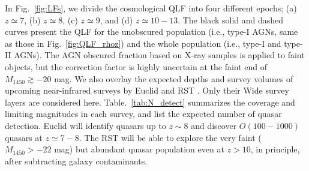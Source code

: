 \documentclass[twocolumn, twocolappendix]{aastex63}
\newcommand{\Muv}{M_{1450}}
\begin{document}
\begin{CJK*}{UTF8}{gbsn}
In Fig.~\ref{fig:LFs}, we divide the cosmological QLF into four different epochs; (a) $z\simeq 7$, (b) $z\simeq 8$, (c) $z\simeq 9$, and (d) $z\simeq 10-13$.
The black solid and dashed curves present the QLF for the unobscured population (i.e., type-I AGNs, same as those in Fig.~\ref{fig:QLF_rhoz})
and the whole population (i.e., type-I and type-II AGNs).
The AGN obscured fraction based on X-ray samples \citep{2014ApJ...786..104U} is applied to faint objects, 
but the correction factor is highly uncertain at the faint end of $\Muv\gtrsim -20$ mag.
We also overlay the expected depths and survey volumes of upcoming near-infrared surveys by
Euclid \citep{2011arXiv1110.3193L} and RST \citep{2019arXiv190205569A}.
Only their Wide survey layers are considered here.
Table.~\ref{tab:N_detect} summarizes the coverage and limiting magnitudes in each survey,
and list the expected number of quasar detection.
Euclid will identify quasars up to $z\sim 8$ and discover $O(100-1000)$ quasars at $z\simeq 7-8$.
The RST will be able to explore the very faint ($\Muv>-22$ mag) but abundant quasar population even at $z>10$, in principle,
after subtracting galaxy contaminants.





\end{CJK*}
\end{document}
